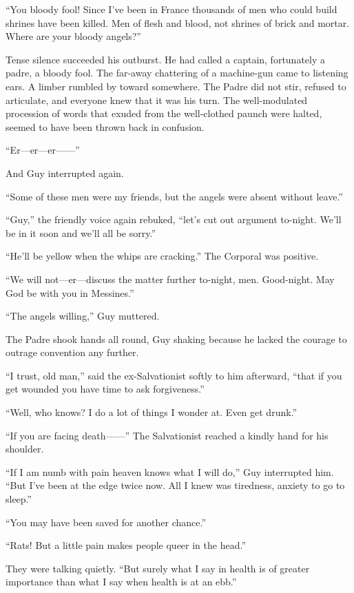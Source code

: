``You bloody fool! Since I've been in France thousands of men who could build shrines have been killed. Men of flesh and blood, not shrines of brick and mortar. Where are your bloody angels?''

Tense silence succeeded his outburst. He had called a captain, fortunately a padre, a bloody fool. The far-away chattering of a machine-gun came to listening ears. A limber rumbled by toward somewhere. The Padre did not stir, refused to articulate, and everyone knew that it was his turn. The well-modulated procession of words that exuded from the well-clothed paunch were halted, seemed to have been thrown back in confusion.

``Er---er---er------''

And Guy interrupted again.

``Some of these men were my friends, but the angels were absent without leave.''

``Guy,'' the friendly voice again rebuked, ``let's cut out argument to-night. We'll be in it soon and we'll all be sorry.''

``He'll be yellow when the whips are cracking.'' The Corporal was positive.

``We will not---er---discuss the matter further to-night, men. Good-night. May God be with you in Messines.''

``The angels willing,'' Guy muttered.

The Padre shook hands all round, Guy shaking because he lacked the courage to outrage convention any further.

``I trust, old man,'' said the ex-Salvationist softly to him afterward, ``that if you get wounded you have time to ask forgiveness.''

``Well, who knows? I do a lot of things I wonder at. Even get drunk.''

``If you are facing death------'' The Salvationist reached a kindly hand for his shoulder.

``If I am numb with pain heaven knows what I will do,'' Guy interrupted him. ``But I've been at the edge twice now. All I knew was tiredness, anxiety to go to sleep.''

``You may have been saved for another chance.''

``Rats! But a little pain makes people queer in the head.''

They were talking quietly. ``But surely what I say in health is of greater importance than what I say when health is at an ebb.''

